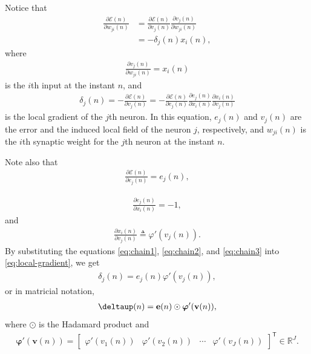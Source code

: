 \documentclass[12pt,a4paper]{article}
\newcommand{\trans}{\mathsf{T}}
\newcommand{\Real}{\mathbb{R}}
\begin{document}
Notice that
\begin{align}
    \frac{\partial \mathscr{E}(n)}{\partial w_{ji}(n)} & = \frac{\partial \mathscr{E}(n)}{\partial v_{j}(n)} \frac{\partial v_j(n)}{\partial w_{ji}(n)} \nonumber \\
    & = - \delta_j (n) x_i(n),
    \label{eq:cost-function}
\end{align}
where
\begin{align}
    \frac{\partial v_j(n)}{\partial w_{ji}(n)} = x_i(n)
    \label{eq:chain4}
\end{align}
is the \(i\)th input at the instant \(n\), and
\begin{align}
    \delta_j (n) = - \frac{\partial \mathscr{E}(n)}{\partial v_{j}(n)} = - \frac{\partial \mathscr{E}(n)}{\partial e_{j}(n)} \frac{\partial e_j(n)}{\partial x_i(n)} \frac{\partial x_i(n)}{\partial v_{j}(n)}
    \label{eq:local-gradient}
\end{align}
is the local gradient of the \(j\)th neuron. In this equation, \(e_{j}(n)\) and \(v_{j}(n)\) are the error and the induced local field of the neuron \(j\), respectively, and \(w_{ji}(n)\) is the \(i\)th synaptic weight for the \(j\)th neuron at the instant \(n\).

Note also that
\begin{align}
    \frac{\partial \mathscr{E}(n)}{\partial e_{j}(n)} = e_{j}(n),
    \label{eq:chain1}
\end{align}

\begin{align}
    \frac{\partial e_j(n)}{\partial x_i(n)} = -1,
    \label{eq:chain2}
\end{align}
and
\begin{align}
    \frac{\partial x_i(n)}{\partial v_{j}(n)} \triangleq \varphi'(v_{j}(n)).
    \label{eq:chain3}
\end{align}
By substituting the equations \eqref{eq:chain1}, \eqref{eq:chain2}, and \eqref{eq:chain3} into \eqref{eq:local-gradient}, we get
\begin{align}
    \delta_j (n) = e_{j}(n) \varphi'(v_{j}(n)),
\end{align}
or in matricial notation,
\begin{align}
    \boldsymbol{\deltaup}(n) = \mathbf{e}(n) \odot \boldsymbol{\varphi}'(\mathbf{v}(n)),
\end{align}
where \(\odot\) is the Hadamard product and
\begin{align}
    \boldsymbol{\varphi}'(\mathbf{v}(n)) = \begin{bmatrix}
        \varphi'(v_1(n)) & \varphi'(v_2(n)) & \cdots & \varphi'(v_J(n))
    \end{bmatrix}^\trans \in \Real^{J}.
\end{align}
\end{document}
